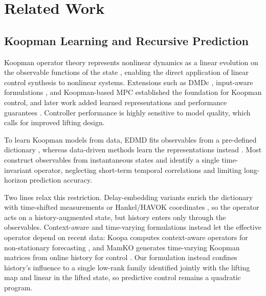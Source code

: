 \section{Related Work}
\label{sec:related_work}

\subsection{Koopman Learning and Recursive Prediction}

Koopman operator theory represents nonlinear dynamics as a linear evolution on the observable functions of the state \cite{koopman1931hamiltonian, koopman1932spectra, mezic2005spectral}, enabling the direct application of linear control synthesis to nonlinear systems. Extensions such as DMDc \cite{proctor2016dmdc}, input-aware formulations \cite{proctor2018generalizing, brunton2016invariant}, and Koopman-based MPC \cite{korda2018linear} established the foundation for Koopman control, and later work added learned representations and performance guarantees \cite{han2020deep, shi2022deep, strasser2026overview, duran2025control}. Controller performance is highly sensitive to model quality, which calls for improved lifting design.

To learn Koopman models from data, EDMD fits observables from a pre-defined dictionary \cite{williams2015data, williams2015kernel, klus2018data}, whereas data-driven methods learn the representations instead \cite{takeishi2017koopman, lusch2018deep, yeung2019learning, morton2019deep, yuan2022variational}. Most construct observables from instantaneous states and identify a single time-invariant operator, neglecting short-term temporal correlations and limiting long-horizon prediction accuracy.

Two lines relax this restriction. Delay-embedding variants enrich the dictionary with time-shifted measurements or Hankel/HAVOK coordinates \cite{kamb2020timedelay, brunton2017chaos, arbabi2017ergodic, das2019delay}, so the operator acts on a history-augmented state, but history enters only through the observables. Context-aware and time-varying formulations instead let the effective operator depend on recent data: Koopa computes context-aware operators for non-stationary forecasting \cite{liu2023koopa}, and MamKO generates time-varying Koopman matrices from online history for control \cite{li2025mamko}. Our formulation instead confines history's influence to a single low-rank family identified jointly with the lifting map and linear in the lifted state, so predictive control remains a quadratic program.

